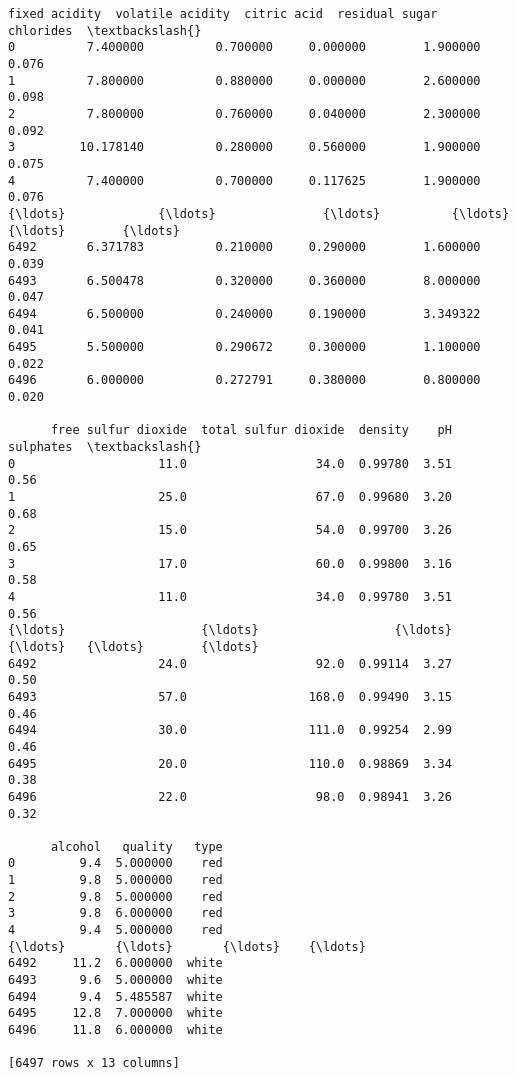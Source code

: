 \documentclass[11pt]{article}
\begin{document}
    
    \begin{Verbatim}[commandchars=\\\{\}]
      fixed acidity  volatile acidity  citric acid  residual sugar  chlorides  \textbackslash{}
0          7.400000          0.700000     0.000000        1.900000      0.076   
1          7.800000          0.880000     0.000000        2.600000      0.098   
2          7.800000          0.760000     0.040000        2.300000      0.092   
3         10.178140          0.280000     0.560000        1.900000      0.075   
4          7.400000          0.700000     0.117625        1.900000      0.076   
{\ldots}             {\ldots}               {\ldots}          {\ldots}             {\ldots}        {\ldots}   
6492       6.371783          0.210000     0.290000        1.600000      0.039   
6493       6.500478          0.320000     0.360000        8.000000      0.047   
6494       6.500000          0.240000     0.190000        3.349322      0.041   
6495       5.500000          0.290672     0.300000        1.100000      0.022   
6496       6.000000          0.272791     0.380000        0.800000      0.020   

      free sulfur dioxide  total sulfur dioxide  density    pH  sulphates  \textbackslash{}
0                    11.0                  34.0  0.99780  3.51       0.56   
1                    25.0                  67.0  0.99680  3.20       0.68   
2                    15.0                  54.0  0.99700  3.26       0.65   
3                    17.0                  60.0  0.99800  3.16       0.58   
4                    11.0                  34.0  0.99780  3.51       0.56   
{\ldots}                   {\ldots}                   {\ldots}      {\ldots}   {\ldots}        {\ldots}   
6492                 24.0                  92.0  0.99114  3.27       0.50   
6493                 57.0                 168.0  0.99490  3.15       0.46   
6494                 30.0                 111.0  0.99254  2.99       0.46   
6495                 20.0                 110.0  0.98869  3.34       0.38   
6496                 22.0                  98.0  0.98941  3.26       0.32   

      alcohol   quality   type  
0         9.4  5.000000    red  
1         9.8  5.000000    red  
2         9.8  5.000000    red  
3         9.8  6.000000    red  
4         9.4  5.000000    red  
{\ldots}       {\ldots}       {\ldots}    {\ldots}  
6492     11.2  6.000000  white  
6493      9.6  5.000000  white  
6494      9.4  5.485587  white  
6495     12.8  7.000000  white  
6496     11.8  6.000000  white  

[6497 rows x 13 columns]
    \end{Verbatim}
\end{document}
